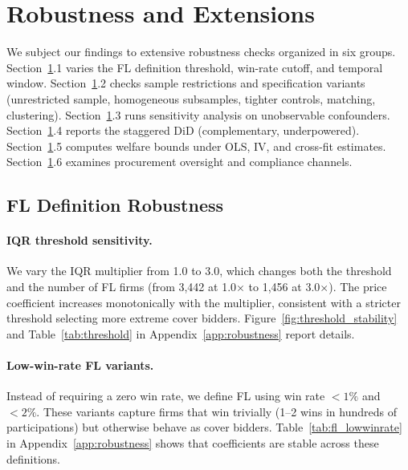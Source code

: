 \section{Robustness and Extensions}
\label{sec:robustness}

We subject our findings to extensive robustness checks organized in six %
groups. Section~\ref{sec:robustness}.1 varies the FL definition
threshold, win-rate cutoff, and temporal window.
Section~\ref{sec:robustness}.2 checks sample restrictions and
specification variants (unrestricted sample, homogeneous subsamples,
tighter controls, matching, clustering).
Section~\ref{sec:robustness}.3 runs sensitivity analysis on unobservable
confounders. Section~\ref{sec:robustness}.4 reports the staggered DiD
(complementary, underpowered). Section~\ref{sec:robustness}.5 computes
welfare bounds under OLS, IV, and cross-fit estimates.
Section~\ref{sec:robustness}.6 examines procurement oversight and
compliance channels.

\subsection{FL Definition Robustness}

\paragraph{IQR threshold sensitivity.}
We vary the IQR multiplier from 1.0 to 3.0, which changes both the
threshold and the number of FL firms (from 3,442 at 1.0$\times$ to 1,456
at 3.0$\times$). The price coefficient increases monotonically with the
multiplier, consistent with a stricter threshold selecting more extreme
cover bidders.
Figure~\ref{fig:threshold_stability} and Table~\ref{tab:threshold} in
Appendix~\ref{app:robustness} report details.

\paragraph{Low-win-rate FL variants.}
Instead of requiring a zero win rate, we define FL using win rate
$< 1\%$ and $< 2\%$. These variants capture firms that win trivially
(1--2 wins in hundreds of participations) but otherwise behave as cover
bidders. Table~\ref{tab:fl_lowwinrate} in Appendix~\ref{app:robustness}
shows that coefficients are stable across these definitions.

